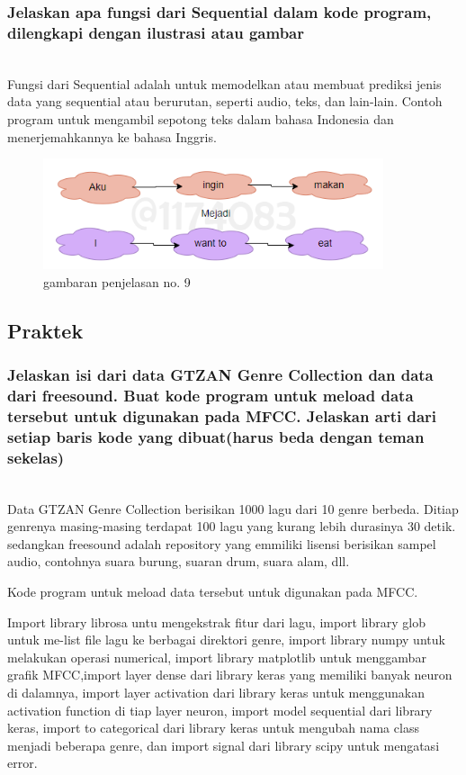 \subsubsection{Jelaskan apa fungsi dari Sequential dalam kode program, dilengkapi dengan ilustrasi atau gambar}
\hfill\\
Fungsi dari Sequential adalah untuk memodelkan atau membuat prediksi jenis data yang sequential atau berurutan, seperti audio, teks, dan lain-lain. Contoh program untuk mengambil sepotong teks dalam bahasa Indonesia dan menerjemahkannya ke bahasa Inggris.
\begin{figure}[H]
	\centering
	\includegraphics[width=10cm]{figures/1174083/figures6/9.png}
	\caption{gambaran penjelasan no. 9}
\end{figure}

\subsection{Praktek}
\subsubsection{Jelaskan isi dari data GTZAN Genre Collection dan data dari freesound. Buat kode program untuk meload data tersebut untuk digunakan pada MFCC. Jelaskan arti dari setiap baris kode yang dibuat(harus beda dengan teman sekelas)}
\hfill\\
Data GTZAN Genre Collection berisikan 1000 lagu dari 10 genre berbeda. Ditiap genrenya masing-masing terdapat 100 lagu yang kurang lebih durasinya 30 detik. sedangkan freesound adalah repository yang emmiliki lisensi berisikan sampel audio, contohnya suara burung, suaran drum, suara alam, dll.

Kode program untuk meload data tersebut untuk digunakan pada MFCC.


Import library librosa untu mengekstrak fitur dari lagu, import library glob untuk me-list file lagu ke berbagai direktori genre, import library numpy untuk melakukan operasi numerical, import library matplotlib untuk menggambar grafik MFCC,import layer dense dari library keras yang memiliki banyak neuron di dalamnya, import layer activation dari library keras untuk menggunakan activation function di tiap layer neuron, import model sequential dari library keras, import to categorical dari library keras untuk mengubah nama class menjadi beberapa genre, dan import signal dari library scipy untuk mengatasi error.

